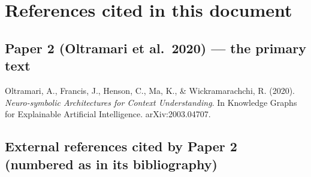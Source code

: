 \documentclass[11pt, a4paper]{article}
\begin{document}
\section*{References cited in this document}

\subsection*{Paper 2 (Oltramari et al.\ 2020) — the primary text}
Oltramari, A., Francis, J., Henson, C., Ma, K., \& Wickramarachchi, R. (2020). \emph{Neuro-symbolic Architectures for Context Understanding}. In Knowledge Graphs for Explainable Artificial Intelligence. arXiv:2003.04707.

\subsection*{External references cited by Paper 2 (numbered as in its bibliography)}
\end{document}
